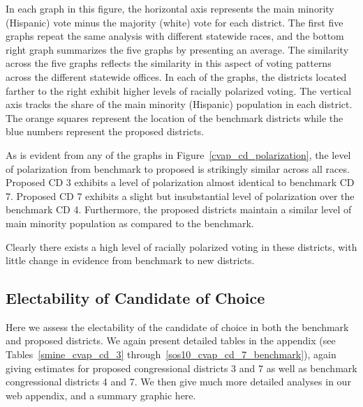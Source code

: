 \documentclass[12pt]{article}
\begin{document}
In each graph in this figure, the horizontal axis represents the main
minority (Hispanic) vote minus the majority (white) vote for each
district.  The first five graphs repeat the same analysis with
different statewide races, and the bottom right graph summarizes the
five graphs by presenting an average.  The similarity across the five
graphs reflects the similarity in this aspect of voting patterns
across the different statewide offices.  In each of the graphs, the
districts located farther to the right exhibit higher levels of
racially polarized voting. The vertical axis tracks the share of the
main minority (Hispanic) population in each district. The orange
squares represent the location of the benchmark districts while the
blue numbers represent the proposed districts.

As is evident from any of the graphs in
Figure~\ref{cvap_cd_polarization}, the level of polarization from
benchmark to proposed is strikingly similar across all races. Proposed
CD 3 exhibits a level of polarization almost identical to benchmark CD
7. Proposed CD 7 exhibits a slight but insubstantial level of
polarization over the benchmark CD 4.  Furthermore, the proposed
districts maintain a similar level of main minority population as
compared to the benchmark.

Clearly there exists a high level of racially polarized voting in
these districts, with little change in evidence from benchmark to new
districts.

\subsection{Electability of Candidate of Choice}

Here we assess the electability of the candidate of choice in both the
benchmark and proposed districts.  We again present detailed tables in
the appendix (see Tables~\ref{smine_cvap_cd_3}
through~\ref{sos10_cvap_cd_7_benchmark}), again giving estimates for
proposed congressional districts 3 and 7 as well as benchmark
congressional districts 4 and 7.  We then give much more detailed
analyses in our web appendix, and a summary graphic here.
\end{document}
